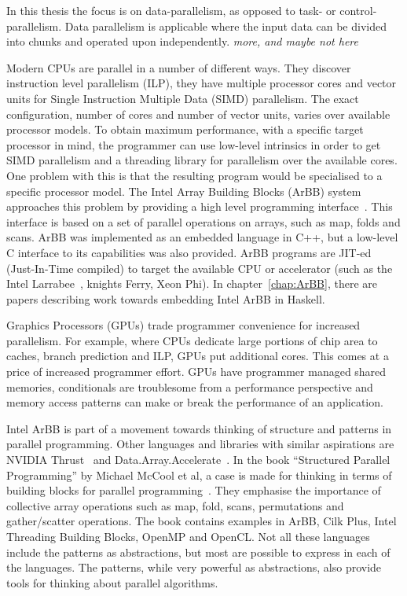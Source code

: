 \documentclass[a4paper]{book}
\begin{document}
In this thesis the focus is on data-parallelism, as opposed to task- or 
control-parallelism. Data parallelism is applicable where the input data can 
be divided into chunks and operated upon independently. \emph{more, and maybe not here}

Modern CPUs are parallel in a number of different ways. They discover instruction
level parallelism (ILP), they have multiple processor cores and vector units for 
Single Instruction Multiple Data (SIMD)  parallelism. The exact configuration, number
of cores and number of vector units, varies over available processor models. 
To obtain maximum performance, with a specific target processor in mind, the programmer
can use low-level intrinsics in order to get SIMD parallelism and a threading library
for parallelism over the available cores. One problem with this is that the resulting program 
would be specialised to a specific processor model. The Intel Array Building Blocks (ArBB) 
system approaches this problem by providing a high level programming interface~\citet{ARBB2011}.
This interface is based on a set of parallel operations on arrays, such as map, folds 
and scans. ArBB was implemented as an embedded language in C++, but a low-level C interface to 
its capabilities was also provided. ArBB programs are JIT-ed (Just-In-Time compiled) to 
target the available CPU or accelerator (such as the Intel Larrabee~\citet{Larrabee}, 
knights Ferry, Xeon Phi). In chapter~\ref{chap:ArBB}, there are papers describing work 
towards embedding Intel ArBB in Haskell. 

Graphics Processors (GPUs) trade programmer convenience for increased parallelism. 
For example, where CPUs dedicate large portions of chip area to caches, branch prediction and 
ILP, GPUs put additional cores. This comes at a price of increased programmer effort.
GPUs have programmer managed shared memories, conditionals are troublesome from a performance 
perspective and memory access patterns can make or break the performance of an 
application.  

Intel ArBB is part of a movement towards thinking of structure and patterns in 
parallel programming. Other languages and libraries with similar aspirations 
are NVIDIA Thrust~\citet{THRUST} and Data.Array.Accelerate~\citet{ACCELERATEDAMP11}.
In the book ``Structured Parallel Programming'' by Michael McCool et al, a case is 
made for thinking in terms of building blocks for parallel programming~\citet{STRUCTURED}. 
They emphasise the importance of collective array operations such as map, fold, scans, 
permutations and gather/scatter operations. The book contains examples in ArBB, Cilk Plus, 
Intel Threading Building Blocks, OpenMP and OpenCL. Not all these languages include 
the patterns as abstractions, but most are possible to express in each of the languages. 
The patterns, while very powerful as abstractions, also provide tools for thinking about 
parallel algorithms. 
\end{document}
